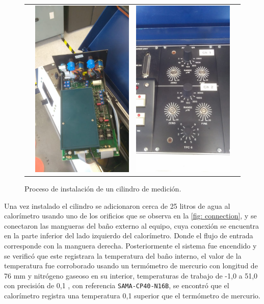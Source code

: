 \begin{figure}[h]
\begin{tabular}{cccc}
			& 
			\includegraphics[width=0.24\linewidth]{Figures/process/p3} &
			\includegraphics[width=0.24\linewidth]{Figures/process/p4} &
		\end{tabular}
		\caption{Proceso de instalación de un cilindro de medición.}
		\label{fig: instalationMultiple}
	\end{figure}
	Una vez instalado el cilindro se adicionaron cerca de 25 litros de agua al calor\'imetro usando uno de los orificios que se observa en la \autoref{fig: connection}, y se conectaron las mangueras del baño externo al equipo, cuya conexión se encuentra en la parte inferior del lado izquierdo del calorímetro. Donde el flujo de entrada corresponde con la manguera derecha. Posteriormente el sistema fue encendido y se verific\'o que este registrara la temperatura del ba\~no interno, el valor de la temperatura fue corroborado usando un term\'ometro de mercurio con longitud de 76 mm y nitr\'ogeno gaseoso en su interior, temperaturas de trabajo de -1,0 \grad{} a 51,0 \grad{} con precisión de 0,1 \grad{}, con referencia \texttt{SAMA-CP40-N16B}, se encontr\'o que el calor\'imetro registra una temperatura 0,1 \grad{} superior que el term\'ometro de mercurio.
	
